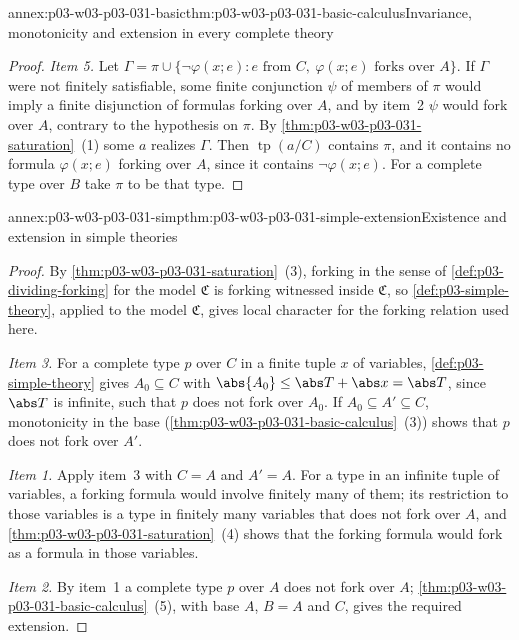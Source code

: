 \begin{annexitem}{annex:p03-w03-p03-031-basic}{thm:p03-w03-p03-031-basic-calculus}{Invariance, monotonicity and extension in every complete theory}
\begin{proof}
\emph{Item 5.}  Let \(\Gamma=\pi\cup\{\neg\varphi(x;e):e\text{ from }C,\
\varphi(x;e)\text{ forks over }A\}\).  If \(\Gamma\) were not finitely
satisfiable, some finite conjunction \(\psi\) of members of \(\pi\) would
imply a finite disjunction of formulas forking over \(A\), and by item~2
\(\psi\) would fork over \(A\), contrary to the hypothesis on \(\pi\).  By
\cref{thm:p03-w03-p03-031-saturation}~(1) some \(a\) realizes \(\Gamma\).
Then \(\operatorname{tp}(a/C)\) contains \(\pi\), and it contains no
formula \(\varphi(x;e)\) forking over \(A\), since it contains
\(\neg\varphi(x;e)\).  For a complete type over \(B\) take \(\pi\) to be
that type.
\end{proof}
\end{annexitem}

\begin{annexitem}{annex:p03-w03-p03-031-simp}{thm:p03-w03-p03-031-simple-extension}{Existence and extension in simple theories}
\begin{proof}
By \cref{thm:p03-w03-p03-031-saturation}~(3), forking in the sense of
\cref{def:p03-dividing-forking} for the model \(\mathfrak C\) is forking
witnessed inside \(\mathfrak C\), so \cref{def:p03-simple-theory}, applied
to the model \(\mathfrak C\), gives local character for the forking
relation used here.

\emph{Item 3.}  For a complete type \(p\) over \(C\) in a finite tuple
\(x\) of variables, \cref{def:p03-simple-theory} gives \(A_0\subseteq C\)
with \(\abs{A_0}\leq\abs T+\abs x=\abs T\), since \(\abs T\) is infinite,
such that \(p\) does not fork over \(A_0\).  If
\(A_0\subseteq A'\subseteq C\), monotonicity in the base
(\cref{thm:p03-w03-p03-031-basic-calculus}~(3)) shows that \(p\) does not
fork over \(A'\).

\emph{Item 1.}  Apply item~3 with \(C=A\) and \(A'=A\).  For a type in an
infinite tuple of variables, a forking formula would involve finitely many
of them; its restriction to those variables is a type in finitely many
variables that does not fork over \(A\), and
\cref{thm:p03-w03-p03-031-saturation}~(4) shows that the forking formula
would fork as a formula in those variables.

\emph{Item 2.}  By item~1 a complete type \(p\) over \(A\) does not fork
over \(A\); \cref{thm:p03-w03-p03-031-basic-calculus}~(5), with base \(A\),
\(B=A\) and \(C\), gives the required extension.
\end{proof}
\end{annexitem}

